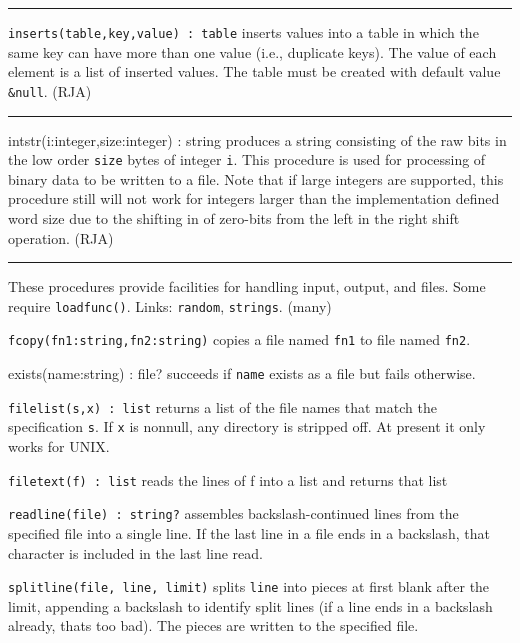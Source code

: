 \vspace{0.25cm}\hrule{}

\texttt{inserts(table,key,value) : table} inserts values into a table in
which the same key can have more than one value (i.e.,
duplicate keys). The value of each element is a
list of inserted values. The table must be created with default value
\texttt{\&null}. (RJA)

\vspace{0.25cm}\hrule{}

\textsf{intstr(i:integer,size:integer) : string} produces a string
consisting of the raw bits in the low order \texttt{size} bytes of
integer \texttt{i}. This procedure is used for processing of
binary data to be written to a file. Note that if
large integers are supported, this procedure still will not work for
integers larger than the implementation defined word size due to the
shifting in of zero-bits from the left in the right shift operation.
(RJA)

\vspace{0.25cm}\hrule{}

These procedures provide facilities for handling input,
output, and files. Some require
\texttt{loadfunc()}. Links: \texttt{random}, \texttt{strings}. (many)

\texttt{fcopy(fn1:string,fn2:string)} copies a file named \texttt{fn1}
to file named \texttt{fn2}.

\textsf{exists(name:string) : file?} succeeds if \texttt{name} exists as
a file but fails otherwise.

\texttt{filelist(s,x) : list} returns a list of the file names that
match the specification \texttt{s}. If \texttt{x} is nonnull, any
directory is stripped off. At present it only works for UNIX.

\texttt{filetext(f) : list} reads the lines of f into a list and returns
that list

\texttt{readline(file) : string?} assembles backslash-continued lines
from the specified file into a single line. If the last line in a file
ends in a backslash, that character is included in the last line read.

\texttt{splitline(file, line, limit)} splits \texttt{line} into pieces
at first blank after the limit, appending a backslash to identify split
lines (if a line ends in a backslash already, that{\textquotesingle}s
too bad). The pieces are written to the specified file.

